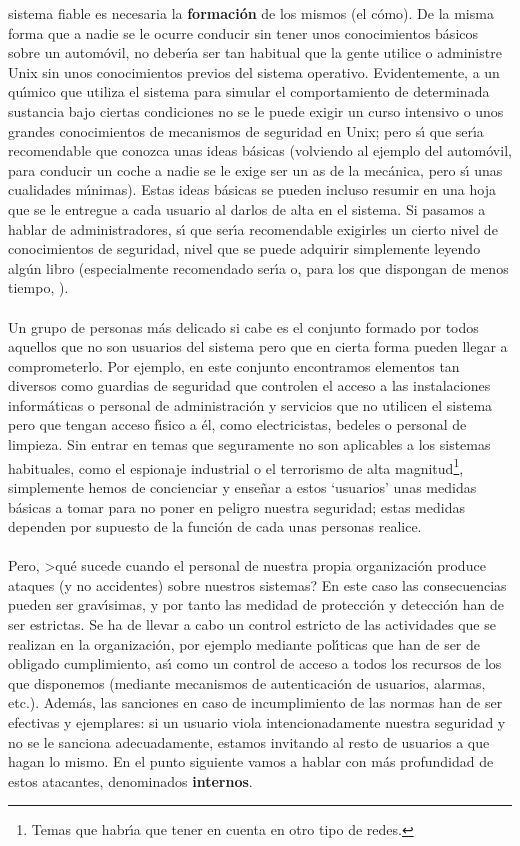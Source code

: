 sistema fiable es necesaria la {\bf formaci\'on} de los mismos (el {\sc 
c\'omo}). De la misma forma que a nadie se le ocurre conducir sin tener unos
conocimientos b\'asicos sobre un autom\'ovil, no deber\'{\i}a ser tan habitual
que la gente utilice o administre Unix sin unos conocimientos previos del
sistema operativo. Evidentemente, a un qu\'{\i}mico que utiliza el sistema para
simular el comportamiento de determinada sustancia bajo ciertas condiciones no
se le puede exigir un curso intensivo o unos grandes conocimientos de mecanismos
de seguridad en Unix; pero s\'{\i} que ser\'{\i}a recomendable que conozca
unas ideas b\'asicas (volviendo al ejemplo del autom\'ovil, para conducir un
coche a nadie se le exige ser un as de la mec\'anica, pero s\'{\i} unas 
cualidades m\'{\i}nimas). Estas ideas b\'asicas se pueden incluso resumir en una
hoja que se le entregue a cada usuario al darlos de alta en el sistema. Si
pasamos a hablar de administradores, s\'{\i} que ser\'{\i}a recomendable 
exigirles un cierto nivel de conocimientos de seguridad, nivel que se puede 
adquirir simplemente leyendo alg\'un libro (especialmente recomendado 
ser\'{\i}a \cite{kn:spa96} o, para los que dispongan de menos tiempo, 
\cite{kn:rcg96}).\\
\\Un grupo de personas m\'as delicado si cabe es el conjunto formado por todos
aquellos que no son usuarios del sistema pero que en cierta forma pueden llegar 
a comprometerlo. Por ejemplo, en este conjunto encontramos elementos tan 
diversos como guardias de seguridad que controlen el acceso a las instalaciones 
inform\'aticas o personal de administraci\'on y servicios que no utilicen el 
sistema pero que tengan acceso f\'{\i}sico a \'el, como electricistas, bedeles
o personal de limpieza. Sin entrar en temas que seguramente no son aplicables
a los sistemas habituales, como el espionaje industrial o el terrorismo
de alta magnitud\footnote{Temas que habr\'{\i}a que tener en cuenta en otro
tipo de redes.}, simplemente hemos de concienciar y ense\~nar a estos `usuarios'
unas medidas b\'asicas a tomar para no poner en peligro nuestra seguridad;
estas medidas dependen por supuesto de la funci\'on de cada unas personas 
realice.\\
\\Pero, >qu\'e sucede cuando el personal de nuestra propia organizaci\'on 
produce ataques (y no accidentes) sobre nuestros sistemas? En este caso las
consecuencias pueden ser grav\'{\i}simas, y por tanto las medidad de 
protecci\'on y detecci\'on han de ser estrictas. Se ha de llevar a cabo un 
control estricto de las actividades que se realizan en la organizaci\'on, por
ejemplo mediante pol\'{\i}ticas que han de ser de obligado cumplimiento, 
as\'{\i} como un control de acceso a todos los recursos de los que disponemos
(mediante mecanismos de autenticaci\'on de usuarios, alarmas, etc.). Adem\'as,
las sanciones en caso de incumplimiento de las normas han de ser efectivas y
ejemplares: si un usuario viola intencionadamente nuestra seguridad y no se
le sanciona adecuadamente, estamos invitando al resto de usuarios a que hagan
lo mismo. En el punto siguiente vamos a hablar con m\'as profundidad de estos 
atacantes, denominados {\bf internos}.
